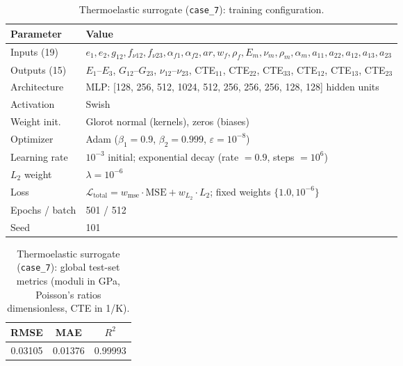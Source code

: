 \documentclass[preprint,review,10pt,number]{elsarticle}
\begin{document}
\begin{table}[h]
\centering
\caption{Thermoelastic surrogate (\texttt{case\_7}): training configuration.}
\label{tab:app_thermo_config}
\begin{tabular}{ll}
\toprule
Parameter & Value \\
\midrule
Inputs (19)     & $e_1, e_2, g_{12}, f_{\nu 12}, f_{\nu 23}, \alpha_{f1}, \alpha_{f2}, ar, w_f, \rho_f, E_m, \nu_m, \rho_m, \alpha_m, a_{11}, a_{22}, a_{12}, a_{13}, a_{23}$ \\
Outputs (15)    & $E_1$--$E_3$, $G_{12}$--$G_{23}$, $\nu_{12}$--$\nu_{23}$, CTE$_{11}$, CTE$_{22}$, CTE$_{33}$, CTE$_{12}$, CTE$_{13}$, CTE$_{23}$ \\
Architecture    & MLP: [128, 256, 512, 1024, 512, 256, 256, 256, 128, 128] hidden units \\
Activation      & Swish \\
Weight init.    & Glorot normal (kernels), zeros (biases) \\
Optimizer       & Adam ($\beta_1 = 0.9$, $\beta_2 = 0.999$, $\varepsilon = 10^{-8}$) \\
Learning rate   & $10^{-3}$ initial; exponential decay (rate $= 0.9$, steps $= 10^{6}$) \\
$L_2$ weight    & $\lambda = 10^{-6}$ \\
Loss            & $\mathcal{L}_{\text{total}} = w_{\text{mse}} \cdot \text{MSE} + w_{L_2} \cdot L_2$; fixed weights $\{1.0, 10^{-6}\}$ \\
Epochs / batch  & 501 / 512 \\
Seed            & 101 \\
\bottomrule
\end{tabular}
\end{table}

\begin{table}[h]
\centering
\caption{Thermoelastic surrogate (\texttt{case\_7}): global test-set
metrics (moduli in GPa, Poisson's ratios dimensionless, CTE in 1/K).}
\label{tab:app_thermo_global}
\begin{tabular}{ccc}
\toprule
RMSE & MAE & $R^2$ \\
\midrule
0.03105 & 0.01376 & 0.99993 \\
\bottomrule
\end{tabular}
\end{table}
\end{document}
